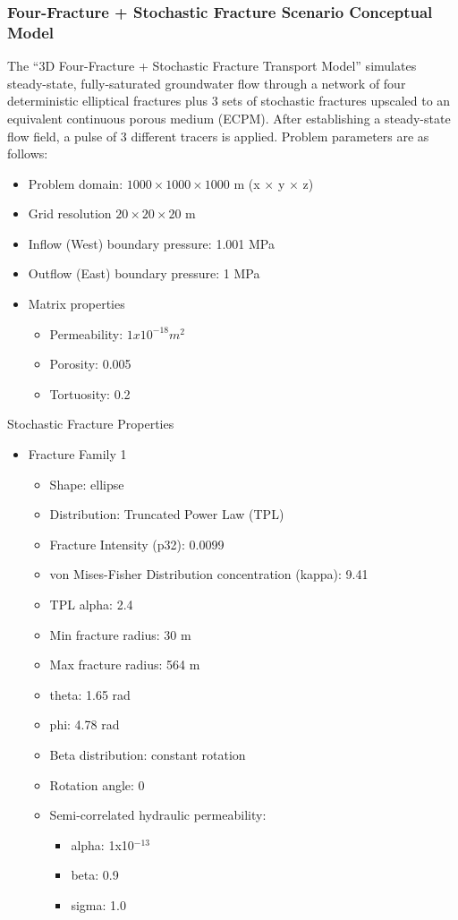 \documentclass{beamer}
\begin{document}
\begin{frame}\frametitle{Four-Fracture + Stochastic Fracture Scenario Conceptual Model}
	The ``3D Four-Fracture + Stochastic Fracture Transport Model'' simulates steady-state, fully-saturated groundwater flow through a network of four deterministic elliptical fractures plus 3 sets of stochastic fractures upscaled to an equivalent continuous porous medium (ECPM). After establishing a steady-state flow field, a pulse of 3 different tracers is applied. Problem parameters are as follows:
	
	\begin{itemize}
		\small
		\item Problem domain: $1000 \times 1000 \times 1000$ m (x $\times$ y $\times$ z)
		\item Grid resolution $20 \times 20 \times 20$ m
		\item Inflow (West) boundary pressure: 1.001 MPa
		\item Outflow (East) boundary pressure: 1 MPa
		\item Matrix properties
		\begin{itemize}
			\footnotesize
			\item Permeability: $1x10^{-18} m^{2}$
			\item Porosity: 0.005
			\item Tortuosity: 0.2
		\end{itemize}
	\end{itemize}

    Stochastic Fracture Properties
		\begin{itemize}
			\item Fracture Family 1
			\begin{itemize}
				\item Shape: ellipse
				\item Distribution: Truncated Power Law (TPL)
				\item Fracture Intensity (p32): 0.0099
				\item von Mises-Fisher Distribution concentration (kappa): 9.41
				\item TPL alpha: 2.4
				\item Min fracture radius: 30 m
				\item Max fracture radius: 564 m
				\item theta: 1.65 rad
				\item phi: 4.78 rad
				\item Beta distribution: constant rotation
				\item Rotation angle: 0
				\item Semi-correlated hydraulic permeability:
				\begin{itemize}
					\item alpha: 1x10$^{-13}$
					\item beta: 0.9
					\item sigma: 1.0
				\end{itemize}
			\end{itemize}
		\end{itemize}


\end{frame}
\end{document}

